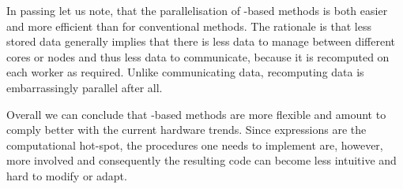 In passing let us note,
that the parallelisation of \contraction-based methods
is both easier and more efficient than for conventional methods.
The rationale is that less stored data generally implies
that there is less data to manage between different cores or nodes
and thus less data to communicate,
because it is recomputed on each worker as required.
Unlike communicating data,
recomputing data is embarrassingly parallel after all.

Overall we can conclude that \contraction-based methods are more flexible
and amount to comply better with the current hardware trends.
Since \contraction expressions are the computational hot-spot,
the procedures one needs to implement are, however,
more involved and consequently the resulting code can become less intuitive
and hard to modify or adapt.
